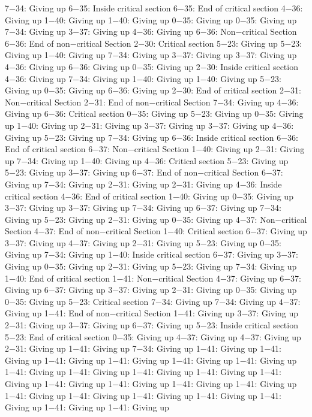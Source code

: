 7−34: Giving up
6−35: Inside critical section
6−35: End of critical section
4−36: Giving up
1−40: Giving up
1−40: Giving up
0−35: Giving up
0−35: Giving up
7−34: Giving up
3−37: Giving up
4−36: Giving up
6−36: Non−critical Section
6−36: End of non−critical Section
2−30: Critical section
5−23: Giving up
5−23: Giving up
1−40: Giving up
7−34: Giving up
3−37: Giving up
3−37: Giving up
4−36: Giving up
6−36: Giving up
0−35: Giving up
2−30: Inside critical section
4−36: Giving up
7−34: Giving up
1−40: Giving up
1−40: Giving up
5−23: Giving up
0−35: Giving up
6−36: Giving up
2−30: End of critical section
2−31: Non−critical Section
2−31: End of non−critical Section
7−34: Giving up
4−36: Giving up
6−36: Critical section
0−35: Giving up
5−23: Giving up
0−35: Giving up
1−40: Giving up
2−31: Giving up
3−37: Giving up
3−37: Giving up
4−36: Giving up
5−23: Giving up
7−34: Giving up
6−36: Inside critical section
6−36: End of critical section
6−37: Non−critical Section
1−40: Giving up
2−31: Giving up
7−34: Giving up
1−40: Giving up
4−36: Critical section
5−23: Giving up
5−23: Giving up
3−37: Giving up
6−37: End of non−critical Section
6−37: Giving up
7−34: Giving up
2−31: Giving up
2−31: Giving up
4−36: Inside critical section
4−36: End of critical section
1−40: Giving up
0−35: Giving up
3−37: Giving up
3−37: Giving up
7−34: Giving up
6−37: Giving up
7−34: Giving up
5−23: Giving up
2−31: Giving up
0−35: Giving up
4−37: Non−critical Section
4−37: End of non−critical Section
1−40: Critical section
6−37: Giving up
3−37: Giving up
4−37: Giving up
2−31: Giving up
5−23: Giving up
0−35: Giving up
7−34: Giving up
1−40: Inside critical section
6−37: Giving up
3−37: Giving up
0−35: Giving up
2−31: Giving up
5−23: Giving up
7−34: Giving up
1−40: End of critical section
1−41: Non−critical Section
4−37: Giving up
6−37: Giving up
6−37: Giving up
3−37: Giving up
2−31: Giving up
0−35: Giving up
0−35: Giving up
5−23: Critical section
7−34: Giving up
7−34: Giving up
4−37: Giving up
1−41: End of non−critical Section
1−41: Giving up
3−37: Giving up
2−31: Giving up
3−37: Giving up
6−37: Giving up
5−23: Inside critical section
5−23: End of critical section
0−35: Giving up
4−37: Giving up
4−37: Giving up
2−31: Giving up
1−41: Giving up
7−34: Giving up
1−41: Giving up
1−41: Giving up
1−41: Giving up
1−41: Giving up
1−41: Giving up
1−41: Giving up
1−41: Giving up
1−41: Giving up
1−41: Giving up
1−41: Giving up
1−41: Giving up
1−41: Giving up
1−41: Giving up
1−41: Giving up
1−41: Giving up
1−41: Giving up
1−41: Giving up
1−41: Giving up
1−41: Giving up
1−41: Giving up
1−41: Giving up
1−41: Giving up
